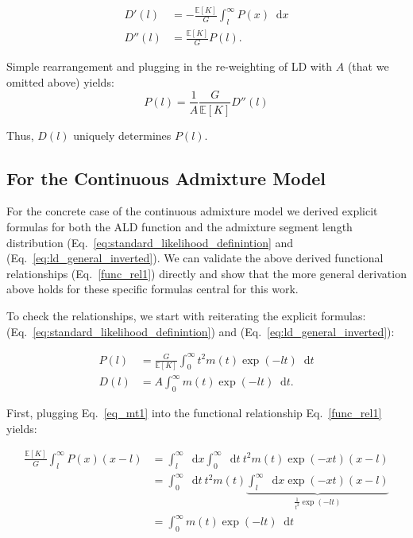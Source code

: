 \documentclass[11pt]{article}
\newcommand*\diff{\mathop{}\!\mathrm{d}}
\begin{document}
\begin{align*}
D'(l) &= -\frac{\mathbb{E}[K]}{G} \int_l^\infty P(x) \diff x \\
D''(l) &= \frac{\mathbb{E}[K]}{G} P(l). 
\end{align*}

Simple rearrangement and plugging in the re-weighting of LD with $A$ (that we omitted above) yields:
\begin{equation}
P(l) = \frac{1}{A}\frac{G}{\mathbb{E}[K]} D''(l)
\label{func_rel2}
\end{equation}

Thus, $D(l)$ uniquely determines $P(l)$.

\subsection{For the Continuous Admixture Model}
For the concrete case of the continuous admixture model we derived explicit formulas for both the ALD function and the admixture segment length distribution (Eq.~\ref{eq:standard_likelihood_definintion} and (Eq.~\ref{eq:ld_general_inverted}). We can validate the above derived functional relationships (Eq.~\ref{func_rel1}) directly and show that the more general derivation above holds for these specific formulas central for this work. 

To check the relationships, we start with reiterating the explicit formulas: (Eq.~\ref{eq:standard_likelihood_definintion}) and (Eq.~\ref{eq:ld_general_inverted}):


\begin{align}
P(l) &= \frac{G}{\mathbb{E}[K]}\int_{0}^{\infty} t^2 m(t) \exp(-lt) \diff t \label{eq_mt1} \\
    D(l) &= A\int_0^{\infty} m(t)\exp(-lt) \diff t \text{.} \label{eq_mt2}
\end{align}

First, plugging Eq.~\ref{eq_mt1} into the functional relationship Eq.~\ref{func_rel1} yields:

\begin{align*}
\frac{\mathbb{E}[K]}{G} \int_l^\infty P(x) (x-l)  &= \int_l^\infty \diff x \int_{0}^{\infty} \diff t\ t^2 m(t) \exp(-xt) (x-l)  \\
&=  \int_{0}^{\infty} \diff t\ t^2 m(t) \underbrace{\int_l^\infty \diff x \exp(-xt) (x-l)}_{\frac{1}{t^2}\exp(-lt)} \\
&= \int_{0}^{\infty} m(t) \exp(-lt) \diff t\
\end{align*}
\end{document}

